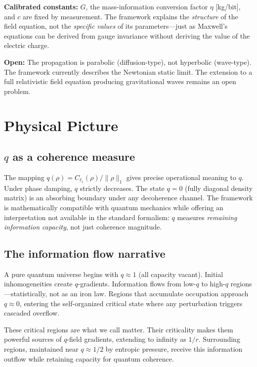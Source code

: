 \documentclass[reprint]{revtex4-2}
\begin{document}
\textbf{Calibrated constants:} $G$, the mass-information conversion factor $\eta$ [kg/bit], and $c$ are fixed by measurement. The framework explains the \emph{structure} of the field equation, not the \emph{specific values} of its parameters---just as Maxwell's equations can be derived from gauge invariance without deriving the value of the electric charge.

\textbf{Open:} The propagation is parabolic (diffusion-type), not hyperbolic (wave-type). The framework currently describes the Newtonian static limit. The extension to a full relativistic field equation producing gravitational waves remains an open problem.

\section{Physical Picture}

\subsection{$q$ as a coherence measure}

The mapping $q(\rho) = C_{\ell_1}(\rho)/\|\rho\|_1$ gives precise operational meaning to $q$. Under phase damping, $q$ strictly decreases. The state $q=0$ (fully diagonal density matrix) is an absorbing boundary under any decoherence channel. The framework is mathematically compatible with quantum mechanics while offering an interpretation not available in the standard formalism: $q$ measures \emph{remaining information capacity}, not just coherence magnitude.

\subsection{The information flow narrative}

A pure quantum universe begins with $q\approx 1$ (all capacity vacant). Initial inhomogeneities create $q$-gradients. Information flows from low-$q$ to high-$q$ regions---statistically, not as an iron law. Regions that accumulate occupation approach $q\approx 0$, entering the self-organized critical state where any perturbation triggers cascaded overflow.

These critical regions are what we call matter. Their criticality makes them powerful sources of $q$-field gradients, extending to infinity as $1/r$. Surrounding regions, maintained near $q\approx 1/2$ by entropic pressure, receive this information outflow while retaining capacity for quantum coherence.
\end{document}
